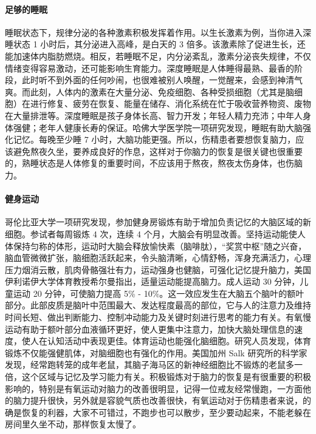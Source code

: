 \documentclass{ctexart}
\begin{document}
\paragraph{足够的睡眠} 睡眠状态下，规律分泌的各种激素积极发挥着作用。以生长激素为例，当你进入深睡状态 1 小时后，其分泌进入高峰，是白天的 3 倍多。该激素除了促进生长，还能加速体内脂肪燃烧。相反，若睡眠不足，内分泌紊乱，激素分泌丧失规律，不仅情绪变得容易激动，还可能影响生育能力。深度睡眠是人体睡得最熟、最香的阶段，此时听不到外面的任何吵闹，也很难被别人唤醒，一觉醒来，会感到神清气爽。而此刻，人体内的激素在大量分泌、免疫细胞、各种受损细胞（尤其是脑细胞）在进行修复、疲劳在恢复、能量在储存、消化系统在忙于吸收营养物资、废物在大量排泄等。深度睡眠是孩子身体长高、智力开发；年轻人精力充沛；中年人身体强健；老年人健康长寿的保证。哈佛大学医学院一项研究发现，睡眠有助大脑强化记忆。每晚至少睡 7 小时，大脑功能更强。所以，伤精患者要想恢复脑力，应该避免熬夜久坐，要养成良好的作息，这样对于你脑力的恢复是很关键也很重要的，熟睡状态是人体修复的重要时间，不应该用于熬夜，熬夜太伤身体，也伤脑力。

\paragraph{健身运动} 哥伦比亚大学一项研究发现，参加健身房锻炼有助于增加负责记忆的大脑区域的新细胞。参试者每周锻炼 4 次，连续 4 个月，大脑会有明显改善。坚持运动能使人体保持匀称的体形，运动时大脑会释放愉快素（脑啡肽），“奖赏中枢”随之兴奋，脑血管微微扩张，脑细胞活跃起来，令头脑清晰，心情舒畅，浑身充满活力，心理压力烟消云散，肌肉骨骼强壮有力，运动强身也健脑，可强化记忆提升脑力，美国伊利诺伊大学体育教授希尔曼指出，适量运动能提高脑力。成人运动 30 分钟，儿童运动 20 分钟，可使脑力提高 5\% - 10\%。这一效应发生在大脑五个脑叶的额叶部分。此部皮质是脑叶中范围最大、发达程度最高的部位，它与人的注意力及维持时间长短、做出判断能力、控制冲动能力及关键时刻进行思考的能力有关。有氧慢运动有助于额叶部分血液循环更好，使人更集中注意力，加快大脑处理信息的速度，使人在认知活动中表现更佳。体育运动也能强化脑细胞。研究人员发现，体育锻炼不仅能强健肌体，对脑细胞也有强化的作用。美国加州 Salk 研究所的科学家发现，经常跑转笼的成年老鼠，其脑子海马区的新神经细胞比不锻炼的老鼠多一倍，这个区域与记忆及学习能力有关。积极锻炼对于脑力的恢复是有很重要的积极影响的，特别是有氧运动对脑力的改善很明显，记得一位戒友经常慢跑，一方面他的脑力提升很快，另外就是容貌气质也改善很快，有氧运动对于伤精患者来说，的确是恢复的利器，大家不可错过，不跑步也可以散步，至少要动起来，不能老躲在房间里久坐不动，那样恢复太慢了。
\end{document}
